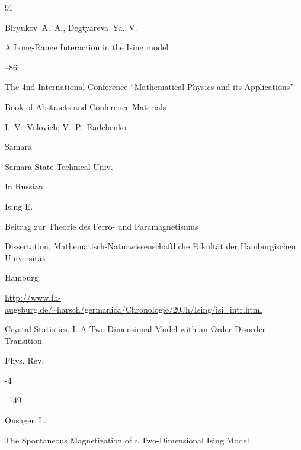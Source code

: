 \begin{thebibliography}{91}




\by  Biryukov~A.~A., Degtyareva~Ya.~V.

\paper A Long-Range Interaction in the Ising model

--86

\inbook  The 4nd International Conference ``Mathematical Physics and its Applications''

\bookinfo Book of Abstracts and Conference Materials

\eds I.~V.~Volovich; V.~P.~Radchenko

\publaddr Samara

\publ Samara State Technical Univ.


\lang In Russian








\by Ising E.

\thesis

Beitrag zur Theorie des Ferro- und Paramagnetismus

\thesisinfo Dissertation, Mathematisch-Naturwissenschaftliche Fakult\"at der Hamburgischen Universit\"at

Hamburg


\elink \url{http://www.fh-augsburg.de/~harsch/germanica/Chronologie/20Jh/Ising/isi_intr.html}




\paper  Crystal Statistics. I. A Two-Dimensional Model with an Order-Disorder Transition


\jour Phys. Rev.


-4 

--149

\by Onsager~L.





\paper  The Spontaneous Magnetization of a Two-Dimensional Ising Model


\end{thebibliography}
